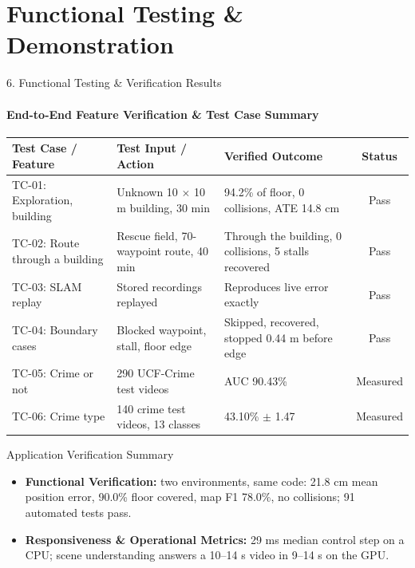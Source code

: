 \documentclass[aspectratio=169, 11pt]{beamer}
\begin{document}
\section{Functional Testing \& Demonstration}

\begin{frame}{6. Functional Testing \& Verification Results}
    \framesubtitle{End-to-End Feature Verification \& Test Case Summary}
    \begin{table}
        \centering
        \scriptsize
        \renewcommand{\arraystretch}{1.15}
        \begin{tabular}{p{3.3cm} p{3.4cm} p{4.6cm} c}
            \toprule
            \textbf{Test Case / Feature} & \textbf{Test Input / Action} & \textbf{Verified Outcome} & \textbf{Status} \\
            \midrule
            TC-01: Exploration, building & Unknown 10 $\times$ 10 m building, 30 min & 94.2\% of floor, 0 collisions, ATE 14.8 cm & Pass \\
            TC-02: Route through a building & Rescue field, 70-waypoint route, 40 min & Through the building, 0 collisions, 5 stalls recovered & Pass \\
            TC-03: SLAM replay & Stored recordings replayed & Reproduces live error exactly & Pass \\
            TC-04: Boundary cases & Blocked waypoint, stall, floor edge & Skipped, recovered, stopped 0.44 m before edge & Pass \\
            TC-05: Crime or not & 290 UCF-Crime test videos & AUC 90.43\% & Measured \\
            TC-06: Crime type & 140 crime test videos, 13 classes & 43.10\% $\pm$ 1.47 & Measured \\
            \bottomrule
        \end{tabular}
    \end{table}

    \begin{block}{Application Verification Summary}
        \scriptsize
        \begin{itemize}
            \item \textbf{Functional Verification:} two environments, same code: 21.8 cm mean position error, 90.0\% floor covered, map F1 78.0\%, no collisions; 91 automated tests pass.
            \item \textbf{Responsiveness \& Operational Metrics:} 29 ms median control step on a CPU; scene understanding answers a 10--14 s video in 9--14 s on the GPU.
        \end{itemize}
    \end{block}
\end{frame}
\end{document}
